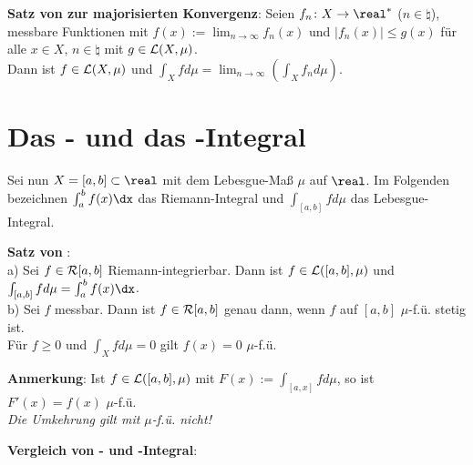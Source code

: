 \textbf{Satz von  zur majorisierten Konvergenz}:
Seien $f_n\colon X \rightarrow \real^\ast$ ($n \in \natural$),
messbare Funktionen mit
$f(x) := \lim_{n \to \infty} f_n(x)$ und
$|f_n(x)| \le g(x)$ für alle $x \in X$, $n \in \natural$
mit $g \in \mathcal{L}(X, \mu)$. \\
Dann ist $f \in \mathcal{L}(X, \mu)$ und
$\int_X f d\mu = \lim_{n \to \infty} \left(\int_X f_n d\mu\right)$.

\section{%
    Das - und das -Integral%
}

Sei nun $X = [a, b] \subset \real$ mit dem Lebesgue-Maß $\mu$ auf $\real$.
Im Folgenden bezeichnen $\int_a^b f(x)\dx$ das Riemann-Integral und
$\int_{[a,b]} f d\mu$ das Lebesgue-Integral.

\textbf{Satz von }: \\
a) Sei $f \in \mathcal{R}[a, b]$ Riemann-integrierbar.
Dann ist $f \in \mathcal{L}([a,b], \mu)$ und
$\int_{[a,b]} f d\mu = \int_a^b f(x)\dx$. \\
b) Sei $f$ messbar.
Dann ist $f \in \mathcal{R}[a, b]$ genau dann, wenn $f$ auf $[a, b]$ $\mu$-f.ü.
stetig ist. \\
Für $f \ge 0$ und $\int_X f d\mu = 0$ gilt $f(x) = 0$ $\mu$-f.ü.

\textbf{Anmerkung}:
Ist $f \in \mathcal{L}([a, b], \mu)$ mit $F(x) := \int_{[a, x]} f d\mu$, so ist
$F'(x) = f(x)$ $\mu$-f.ü. \\
\emph{Die Umkehrung gilt mit $\mu$-f.ü. nicht!}

\linie

\textbf{Vergleich von - und -Integral}:

